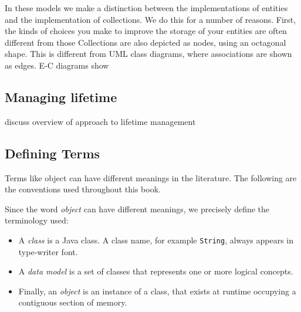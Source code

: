 In these models we make a distinction between the implementations of entities and the implementation of collections.  We do this for a number of reasons.  First, the kinds of choices you make to improve the storage of your entities are often different from those Collections are also depicted as nodes, using an octagonal shape.  This is different from UML class diagrams, where associations are shown as edges. E-C diagrams show 

\subsection{Managing lifetime}

discuss overview of approach to lifetime management

\subsection{Defining Terms}

Terms like object can have different meanings in the literature.  The following are the conventions used throughout this book.

Since the word \textit{object} can have different meanings, we precisely define the terminology used:
\begin{itemize}
\item A \textit{class} is a Java class. A class name, for example \texttt{String}, always appears in type-writer font. 
\item A \textit{data model} is a set of classes that represents one or more logical concepts.
\item Finally, an \textit{object} is an instance of a class, that exists at runtime occupying a contiguous section of memory.
\end{itemize} 







 

